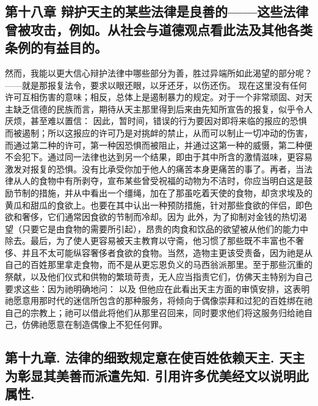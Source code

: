 
\subsection{第十八章 辩护天主的某些法律是良善的——这些法律曾被攻击，例如。从社会与道德观点看此法及其他各类条例的有益目的。}

然而，我能以更大信心辩护法律中哪些部分为善，胜过异端所如此渴望的部分呢？——就是那报复法令，要求以眼还眼，以牙还牙，以伤还伤。 现在这里没有任何许可互相伤害的意味；相反，总体上是遏制暴力的规定。对于一个非常顽固、对天主缺乏信德的民族而言，期待从天主那里得到后来由先知所宣告的报复，似乎令人厌烦，甚至难以置信： 因此，暂时间，错误的行为要因对即将来临的报应的恐惧而被遏制；所以这报应的许可乃是对挑衅的禁止，从而可以制止一切冲动的伤害，而通过第二种的许可，第一种因恐惧而被阻止，并通过这第一种的威慑，第二种便不会犯下。通过同一法律也达到另一个结果，即由于其中所含的激情滋味，更容易激发对报复的恐惧。没有比承受你加于他人的痛苦本身更痛苦的事了。再者，当法律从人的食物中有所剥夺，宣布某些曾受祝福的动物为不洁时，你应当明白这是鼓励节制的措施，并从中看出一个缰绳，加在了那虽吃着天使的食物，却贪求埃及的黄瓜和甜瓜的食欲上。也要在其中认出一种预防措施，针对那些食欲的伴侣，即色欲和奢侈，它们通常因食欲的节制而冷却。因为 此外，为了抑制对金钱的热切渴望（只要它是由食物的需要所引起），昂贵的肉食和饮品的欲望被从他们的能力中除去。最后，为了使人更容易被天主教育以守斋，他习惯了那些既不丰富也不奢侈、并且不太可能纵容奢侈者食欲的食物。当然，造物主更该受责备，因为祂是从自己的百姓那里拿走食物，而不是从更忘恩负义的马西翁派那里。至于那些沉重的祭献，以及他们仪式和供物的繁琐苛责，无人应当指责它们，仿佛天主特别为自己要求这些：因为祂明确地问： 以及 但他应在此看出天主方面的审慎安排，这表明祂愿意用那时代的迷信所包含的那种服务，将倾向于偶像崇拜和过犯的百姓绑在祂自己的宗教上；祂可以借此将他们从那里召回来，同时要求他们将这服务归给祂自己，仿佛祂愿意在制造偶像上不犯任何罪。\par


\subsection{第十九章. 法律的细致规定意在使百姓依赖天主. 天主为彰显其美善而派遣先知. 引用许多优美经文以说明此属性.}

